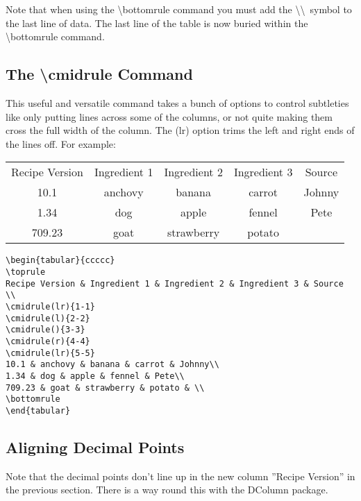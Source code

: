 Note that when using the {\textbackslash}bottomrule command you must add the \textbackslash\textbackslash ~symbol to the last line of data.  The last line of the table is now buried within the {\textbackslash}bottomrule command.

\pagebreak
\subsection{The {\textbackslash}cmidrule Command}
This useful and versatile command takes a bunch of options to control subtleties like only putting lines across some of the columns, or not quite making them cross the full width of the column. The (lr) option trims the left and right ends of the lines off. For example:

\begin{center}
\begin{tabular}{ccccc}
\toprule
Recipe Version & Ingredient 1 & Ingredient 2 & Ingredient 3 & Source \\
\cmidrule(lr){1-1}
\cmidrule(l){2-2}
\cmidrule(){3-3}
\cmidrule(r){4-4}
\cmidrule(lr){5-5}
10.1 & anchovy & banana & carrot & Johnny\\
1.34 & dog & apple & fennel & Pete\\
709.23 & goat & strawberry & potato & \\
\bottomrule
\end{tabular}

\vspace*{2ex}

\begin{verbatim}
\begin{tabular}{ccccc}
\toprule
Recipe Version & Ingredient 1 & Ingredient 2 & Ingredient 3 & Source \\
\cmidrule(lr){1-1}
\cmidrule(l){2-2}
\cmidrule(){3-3}
\cmidrule(r){4-4}
\cmidrule(lr){5-5}
10.1 & anchovy & banana & carrot & Johnny\\
1.34 & dog & apple & fennel & Pete\\
709.23 & goat & strawberry & potato & \\
\bottomrule
\end{tabular}
\end{verbatim}
\end{center}

\pagebreak
\subsection{Aligning Decimal Points}
Note that the decimal points don't line up in the new column ''Recipe Version'' in the previous section. There is a way round this with the DColumn package.

